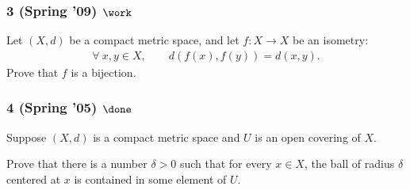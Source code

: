 \hypertarget{spring-09-work}{%
\subsubsection{\texorpdfstring{3 (Spring '09)
\(\work\)}{3 (Spring '09) \textbackslash work}}\label{spring-09-work}}

\begin{problem}[?]

Let \((X, d)\) be a compact metric space, and let \(f : X \to X\) be an
isometry:
\begin{align*}
\forall~ x, y \in X, \qquad d(f (x), f (y)) = d(x, y)
.\end{align*}
Prove that \(f\) is a bijection.

\end{problem}

\hypertarget{spring-05-done}{%
\subsubsection{\texorpdfstring{4 (Spring '05)
\(\done\)}{4 (Spring '05) \textbackslash done}}\label{spring-05-done}}

\begin{problem}[?]

Suppose \((X, d)\) is a compact metric space and \(U\) is an open
covering of \(X\).

Prove that there is a number \(\delta > 0\) such that for every
\(x \in X\), the ball of radius \(\delta\) centered at \(x\) is
contained in some element of \(U\).

\end{problem}

